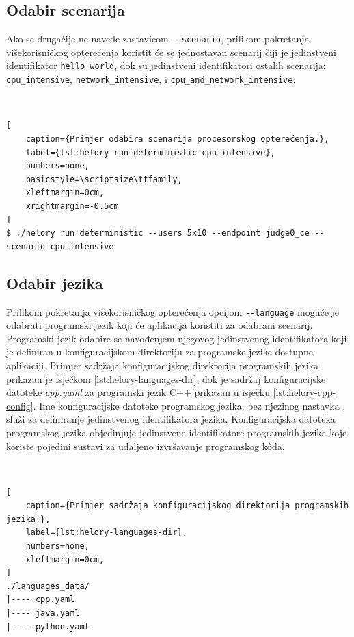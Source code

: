 \documentclass[times, utf8, diplomski]{fer}
\begin{document}
\pagebreak

\subsection{Odabir scenarija}
Ako se drugačije ne navede zastavicom \lstinline{--scenario}, prilikom pokretanja višekorisničkog opterećenja koristit će se jednostavan scenarij čiji je jedinstveni identifikator \lstinline{hello_world}, dok su jedinstveni identifikatori ostalih scenarija: \lstinline{cpu_intensive}, \lstinline{network_intensive}, i \lstinline{cpu_and_network_intensive}.

\

\begin{lstlisting}[
    caption={Primjer odabira scenarija procesorskog opterećenja.},
    label={lst:helory-run-deterministic-cpu-intensive},
    numbers=none,
    basicstyle=\scriptsize\ttfamily,
    xleftmargin=0cm,
    xrightmargin=-0.5cm
]
$ ./helory run deterministic --users 5x10 --endpoint judge0_ce --scenario cpu_intensive
\end{lstlisting}

\subsection{Odabir jezika}
Prilikom pokretanja višekorisničkog opterećenja opcijom \lstinline{--language} moguće je odabrati programski jezik koji će aplikacija koristiti za odabrani scenarij. Programski jezik odabire se navođenjem njegovog jedinstvenog identifikatora koji je definiran u konfiguracijskom direktoriju za programske jezike dostupne aplikaciji. Primjer sadržaja konfiguracijskog direktorija programskih jezika prikazan je isječkom \ref{lst:helory-languages-dir}, dok je sadržaj konfiguracijske datoteke \textit{cpp.yaml} za programski jezik C++ prikazan u isječku \ref{lst:helory-cpp-config}. Ime konfiguracijske datoteke programskog jezika, bez njezinog nastavka , služi za definiranje jedinstvenog identifikatora jezika. Konfiguracijska datoteka programskog jezika objedinjuje jedinstvene identifikatore programskih jezika koje koriste pojedini sustavi za udaljeno izvršavanje programskog kôda.

\

\begin{lstlisting}[
    caption={Primjer sadržaja konfiguracijskog direktorija programskih jezika.},
    label={lst:helory-languages-dir},
    numbers=none,
    xleftmargin=0cm,
]
./languages_data/
|---- cpp.yaml
|---- java.yaml
|---- python.yaml
\end{lstlisting}
\end{document}
